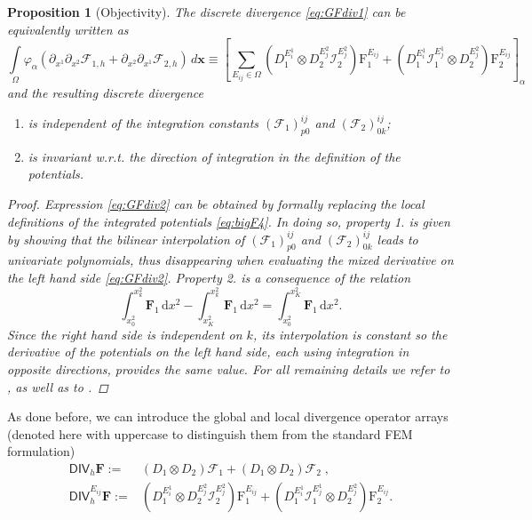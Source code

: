 \documentclass[a4paper,10pt]{article}
\newtheorem{proposition}[theorem]{Proposition}
\begin{document}
\begin{proposition}[Objectivity] The discrete divergence \eqref{eq:GFdiv1} can be equivalently written as 
\begin{equation}\label{eq:GFdiv2}
\int\limits_\Omega\varphi_{\alpha}\left( \partial_{x^1} \partial_{x^2} \mathcal{F}_{1,h} + \partial_{x^2}\partial_{x^1} \mathcal{F}_{2,h}\right)\,d\mathbf{x}\equiv 
\left[\sum_{E_{ij}\in\Omega} ( D_1^{E_i^{1}}\otimes D_2^{E_j^{2}} \mathcal{I}^{E_j^{2}}_2 ) \mathrm{F}_1^{E_{ij}} +  ( D_1^{E_i^{1}}   \mathcal{I}^{E_j^{1}}_1 \otimes D_2^{E_j^{2}} ) \mathrm{F}_2^{E_{ij}}  \right]_{\alpha}
\end{equation}
and the resulting discrete divergence
\begin{enumerate}
\item  is independent of the integration constants  $(\mathcal{F}_1)^{ij}_{p0}$ and $(\mathcal{F}_2)^{ij}_{0k}$;
\item  is invariant w.r.t. the  direction of integration in the definition of the potentials. 
\end{enumerate}
\begin{proof}
Expression  \eqref{eq:GFdiv2} can be obtained  by formally replacing the local definitions of the integrated potentials \eqref{eq:bigF4}.
In doing so, property 1.  is  given by showing that the bilinear interpolation of $(\mathcal{F}_1)^{ij}_{p0}$ and $(\mathcal{F}_2)^{ij}_{0k}$ leads to univariate polynomials,
thus disappearing when evaluating the mixed derivative  on the left hand side   \eqref{eq:GFdiv2}. Property 2. is a consequence of the relation
$$
\int_{x^2_{0}}^{x^2_{k}}\mathbf{F}_1\,\mathrm{d}x^2 -   \int_{x^2_{K}}^{x^2_{k}}\mathbf{F}_1\,\mathrm{d}x^2  = \int_{x^2_{0}}^{x^2_{K}}\mathbf{F}_1\,\mathrm{d}x^2.
$$
Since the right hand side  is independent on $k$, its interpolation is constant so the derivative  of the potentials on the left hand side, each using integration in opposite directions,
provides the same value.  For  all remaining details we refer to \cite[Proposition 6 and Proposition 9]{barsukow2025structure}, as well as to \cite[Section 4.1]{barsukow2025stationaritypreservingnodalfinite}.
\end{proof}
\end{proposition}
As done before, we can introduce  the global and local divergence operator arrays (denoted here with uppercase to distinguish them from the standard FEM formulation)
\begin{equation}\label{eq:GFdiv3}\begin{aligned}
\textsf{DIV}_h \mathbf{F}:=  & ( D_1\otimes D_2) \mathcal{F}_1   + (D_1\otimes D_2 )\mathcal{F}_2  \;,\\
\textsf{DIV}_h^{E_{ij}}  \mathbf{F}:=  &( D_1^{E_i^{1}}\otimes D_2^{E_j^{2}} \mathcal{I}^{E_j^{2}}_2 ) \mathrm{F}_1^{E_{ij}} +  ( D_1^{E_i^{1}}   \mathcal{I}^{E_j^{1}}_1 \otimes D_2^{E_j^{2}} ) \mathrm{F}_2^{E_{ij}}  .
\end{aligned}
\end{equation}
\end{document}

